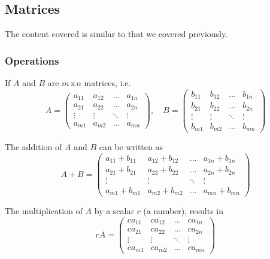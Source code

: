 \documentclass[diffeq.tex]{subfiles}
\begin{document}
    \subsection{Matrices}
    The content covered is similar to that we covered previously.
    \subsubsection{Operations}
    If $A$ and $B$ are $m$\,x$\,n$ matrices, i.e.
    \begin{equation}
        A = \begin{pmatrix}
            a_{11} & a_{12} & \dots & a_{1n}\\
            a_{21} & a_{22} & \dots & a_{2n}\\
            \vdots & \vdots & \ddots & \vdots\\
            a_{m1} & a_{m2} & \dots & a_{mn}
        \end{pmatrix},\quad B = \begin{pmatrix}
            b_{11} & b_{12} & \dots & b_{1n}\\
            b_{21} & b_{22} & \dots & b_{2n}\\
            \vdots & \vdots & \ddots & \vdots\\
            b_{m1} & b_{m2} & \dots & b_{mn}
        \end{pmatrix}
    \end{equation}
    \begin{definition}[Addition]
        The addition of $A$ and $B$ can be written as
        \begin{equation}
            A + B = \begin{pmatrix}
                a_{11} + b_{11} & a_{12} + b_{12} & \dots & a_{1n} + b_{1n}\\
                a_{21} + b_{21} & a_{22} + b_{22} & \dots & a_{2n} + b_{2n}\\
                \vdots & \vdots & \ddots & \vdots\\
                a_{m1} + b_{m1} & a_{m2} + b_{m2} & \dots & a_{mn} + b_{mn}
            \end{pmatrix}
        \end{equation}
    \end{definition}
    \begin{definition}
        The multiplication of $A$ by a scalar $c$ (a number), results in
        \begin{equation}
            cA = \begin{pmatrix}
                ca_{11} & ca_{12} & \dots & ca_{1n}\\
                ca_{21} & ca_{22} & \dots & ca_{2n}\\
                \vdots & \vdots & \ddots & \vdots\\
                ca_{m1} & ca_{m2} & \dots & ca_{mn}
            \end{pmatrix}
        \end{equation}
    \end{definition}
\end{document}
